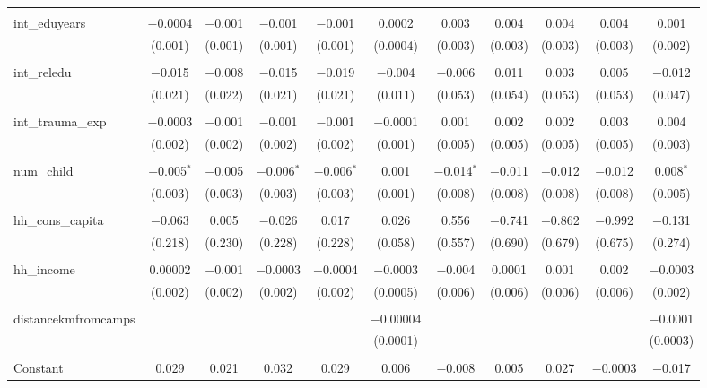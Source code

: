 \begin{table}[H]
\begin{tabular}{@{\extracolsep{4pt}}lcccccccccc}
  & & & & & & & & & & \\ 
 int\_eduyears & $-$0.0004 & $-$0.001 & $-$0.001 & $-$0.001 & 0.0002 & 0.003 & 0.004 & 0.004 & 0.004 & 0.001 \\ 
  & (0.001) & (0.001) & (0.001) & (0.001) & (0.0004) & (0.003) & (0.003) & (0.003) & (0.003) & (0.002) \\ 
  & & & & & & & & & & \\ 
 int\_reledu & $-$0.015 & $-$0.008 & $-$0.015 & $-$0.019 & $-$0.004 & $-$0.006 & 0.011 & 0.003 & 0.005 & $-$0.012 \\ 
  & (0.021) & (0.022) & (0.021) & (0.021) & (0.011) & (0.053) & (0.054) & (0.053) & (0.053) & (0.047) \\ 
  & & & & & & & & & & \\ 
 int\_trauma\_exp & $-$0.0003 & $-$0.001 & $-$0.001 & $-$0.001 & $-$0.0001 & 0.001 & 0.002 & 0.002 & 0.003 & 0.004 \\ 
  & (0.002) & (0.002) & (0.002) & (0.002) & (0.001) & (0.005) & (0.005) & (0.005) & (0.005) & (0.003) \\ 
  & & & & & & & & & & \\ 
 num\_child & $-$0.005$^{*}$ & $-$0.005 & $-$0.006$^{*}$ & $-$0.006$^{*}$ & 0.001 & $-$0.014$^{*}$ & $-$0.011 & $-$0.012 & $-$0.012 & 0.008$^{*}$ \\ 
  & (0.003) & (0.003) & (0.003) & (0.003) & (0.001) & (0.008) & (0.008) & (0.008) & (0.008) & (0.005) \\ 
  & & & & & & & & & & \\ 
 hh\_cons\_capita & $-$0.063 & 0.005 & $-$0.026 & 0.017 & 0.026 & 0.556 & $-$0.741 & $-$0.862 & $-$0.992 & $-$0.131 \\ 
  & (0.218) & (0.230) & (0.228) & (0.228) & (0.058) & (0.557) & (0.690) & (0.679) & (0.675) & (0.274) \\ 
  & & & & & & & & & & \\ 
 hh\_income & 0.00002 & $-$0.001 & $-$0.0003 & $-$0.0004 & $-$0.0003 & $-$0.004 & 0.0001 & 0.001 & 0.002 & $-$0.0003 \\ 
  & (0.002) & (0.002) & (0.002) & (0.002) & (0.0005) & (0.006) & (0.006) & (0.006) & (0.006) & (0.002) \\ 
  & & & & & & & & & & \\ 
 distancekmfromcamps &  &  &  &  & $-$0.00004 &  &  &  &  & $-$0.0001 \\ 
  &  &  &  &  & (0.0001) &  &  &  &  & (0.0003) \\ 
  & & & & & & & & & & \\ 
 Constant & 0.029 & 0.021 & 0.032 & 0.029 & 0.006 & $-$0.008 & 0.005 & 0.027 & $-$0.0003 & $-$0.017 \\ 

\end{tabular}
\end{table}
